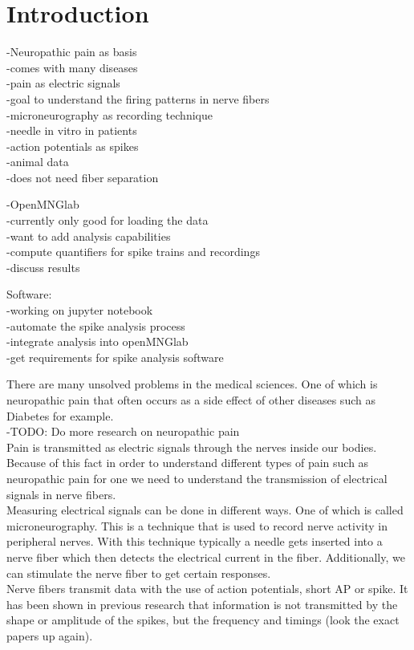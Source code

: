 \chapter{Introduction}


-Neuropathic pain as basis \\
-comes with many diseases \\ 

-pain as electric signals \\
-goal to understand the firing patterns in nerve fibers \\
-microneurography as recording technique \\
-needle in vitro in patients \\
-action potentials as spikes \\
-animal data \\
-does not need fiber separation  

-OpenMNGlab \\
-currently only good for loading the data \\
-want to add analysis capabilities \\
-compute quantifiers for spike trains and recordings \\
-discuss results 
 
Software: \\
-working on jupyter notebook \\
-automate the spike analysis process \\
-integrate analysis into openMNGlab \\
-get requirements for spike analysis software 


There are many unsolved problems in the medical sciences. One of which is neuropathic pain that often occurs as a side effect of other diseases such as Diabetes for example. \\
-TODO: Do more research on neuropathic pain \\
Pain is transmitted as electric signals through the nerves inside our bodies. Because of this fact in order to understand different types of pain such as neuropathic pain for one we need to understand the transmission of electrical signals in nerve fibers. \\
Measuring electrical signals can be done in different ways. One of which is called microneurography. This is a technique that is used to record nerve activity in peripheral nerves. With this technique typically a needle gets inserted into a nerve fiber which then detects the electrical current in the fiber. Additionally, we can stimulate the nerve fiber to get certain responses. \\
Nerve fibers transmit data with the use of action potentials, short AP or spike. It has been shown in previous research that information is not transmitted by the shape or amplitude of the spikes, but the frequency and timings (look the exact papers up again). 

\cite{SE10}

\cleardoublepage
